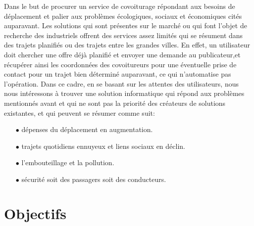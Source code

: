 Dans le but de procurer un service de covoiturage répondant aux besoins de déplacement et palier aux problèmes écologiques, sociaux et économiques cités auparavant.\newline
Les solutions qui sont présentes sur le marché ou qui font l'objet de recherche des industriels offrent des services assez limités qui se résument dans des trajets planifiés ou des trajets entre les grandes villes.\newline
En effet, un utilisateur doit chercher une offre déjà planifié et envoyer une demande au publicateur,et récupérer ainsi les coordonnées des covoitureurs pour une éventuelle prise de contact pour un trajet bien déterminé auparavant, ce qui n'automatise pas l’opération.\newline
Dans ce cadre, en se basant sur les attentes des utilisateurs, nous nous intéressons à trouver une solution informatique qui répond aux problèmes mentionnés avant et qui ne sont pas la priorité des créateurs de solutions existantes, et qui peuvent se résumer comme suit:
\begin{itemize}
 
\item[$\bullet$] dépenses du déplacement en augmentation.
\item[$\bullet$] trajets quotidiens ennuyeux et liens sociaux en déclin.
\item[$\bullet$] l'embouteillage et la pollution.
\item[$\bullet$] sécurité soit des passagers soit des conducteurs.
 
\end{itemize}

\section{Objectifs}

